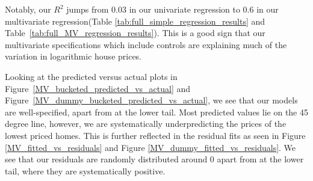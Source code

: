 Notably, our $R^2$ jumps from 0.03 in our univariate regression to 0.6 in our multivariate regression(Table \ref{tab:full_simple_regression_results} and Table~\ref{tab:full_MV_regression_results}).
This is a good sign that our multivariate specifications which include controls are explaining much of the variation in logarithmic house prices.

Looking at the predicted versus actual plots in Figure~\ref{MV_bucketed_predicted_vs_actual} and Figure~\ref{MV_dummy_bucketed_predicted_vs_actual}, we see that our models are well-specified, apart from at the lower tail.
Most predicted values lie on the 45 degree line, however, we are systematically underpredicting the prices of the lowest priced homes. This is further reflected in the residual fits
as seen in Figure \ref{MV_fitted_vs_residuals} and Figure \ref{MV_dummy_fitted_vs_residuals}. We see that our residuals are randomly distributed around 0 apart from at the lower tail, where they are systematically positive.